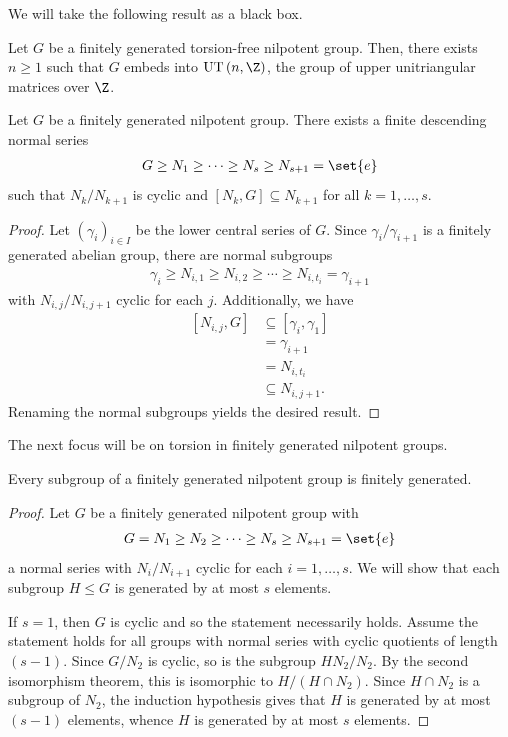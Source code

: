 \documentclass[10pt]{mypackage}
\begin{document}
We will take the following result as a black box.
\begin{theorem}
  Let $G$ be a finitely generated torsion-free nilpotent group. Then, there exists $n\geq 1$ such that $G$ embeds into $\operatorname{UT}\left( n,\Z \right)$, the group of upper unitriangular matrices over $\Z$.
\end{theorem}
\begin{theorem}
  Let $G$ be a finitely generated nilpotent group. There exists a finite descending normal series
  \begin{align*}
    G\geq N_1\geq\cdots\geq N_s\geq N_{s+1}= \set{e}
  \end{align*}
  such that $N_k/N_{k+1}$ is cyclic and $\left[ N_k,G \right]\subseteq N_{k+1}$ for all $k=1,\dots,s$.
\end{theorem}
\begin{proof}
  Let $\left( \gamma_i \right)_{i\in I}$ be the lower central series of $G$. Since $\gamma_i/\gamma_{i+1}$ is a finitely generated abelian group, there are normal subgroups
  \begin{align*}
    \gamma_i\geq N_{i,1}\geq N_{i,2}\geq\cdots\geq N_{i,t_i} = \gamma_{i+1}
  \end{align*}
  with $N_{i,j}/N_{i,j+1}$ cyclic for each $j$. Additionally, we have 
  \begin{align*}
    \left[ N_{i,j},G \right]&\subseteq \left[ \gamma_i,\gamma_1 \right]\\
                            &= \gamma_{i+1}\\
                            &= N_{i,t_i}\\
                            &\subseteq N_{i,j+1}.
  \end{align*}
  Renaming the normal subgroups yields the desired result.
\end{proof}
The next focus will be on torsion in finitely generated nilpotent groups.
\begin{lemma}
  Every subgroup of a finitely generated nilpotent group is finitely generated.
\end{lemma}
\begin{proof}
  Let $G$ be a finitely generated nilpotent group with
  \begin{align*}
    G = N_1\geq N_2\geq\cdots\geq N_s\geq N_{s+1} = \set{e}
  \end{align*}
  a normal series with $N_i/N_{i+1}$ cyclic for each $i=1,\dots,s$. We will show that each subgroup $H\leq G$ is generated by at most $s$ elements.

  If $s = 1$, then $G$ is cyclic and so the statement necessarily holds. Assume the statement holds for all groups with normal series with cyclic quotients of length $\left( s-1 \right)$. Since $G/N_2$ is cyclic, so is the subgroup $HN_2/N_2$. By the second isomorphism theorem, this is isomorphic to $H/\left( H\cap N_2 \right)$. Since $H\cap N_2$ is a subgroup of $N_2$, the induction hypothesis gives that $H$ is generated by at most $\left( s-1 \right)$ elements, whence $H$ is generated by at most $s$ elements.
\end{proof}
\end{document}
